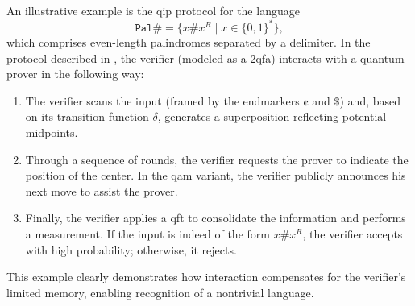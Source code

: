 \begin{example}
An illustrative example is the \gls{qip} protocol for the language
\[
\mathtt{Pal\#} = \{x\#x^R \mid x\in\{0,1\}^*\},
\]
which comprises even-length palindromes separated by a delimiter. In the protocol described in \cite{nishimura2015interactive}, the verifier (modeled as a 2qfa) interacts with a quantum prover in the following way:
\begin{enumerate}
  \item The verifier scans the input (framed by the endmarkers $\cent$ and $\$$) and, based on its transition function $\delta$, generates a superposition reflecting potential midpoints.
  \item Through a sequence of rounds, the verifier requests the prover to indicate the position of the center. In the \gls{qam} variant, the verifier publicly announces his next move to assist the prover.
  \item Finally, the verifier applies a \gls{qft} to consolidate the information and performs a measurement. If the input is indeed of the form $x\#x^R$, the verifier accepts with high probability; otherwise, it rejects.
\end{enumerate}
This example clearly demonstrates how interaction compensates for the verifier's limited memory, enabling recognition of a nontrivial language.
\end{example}